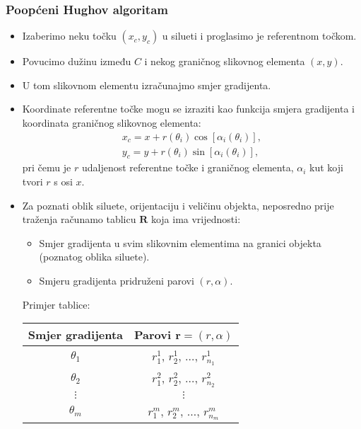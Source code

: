 \documentclass[11pt,english]{article}
\begin{document}
\subsubsection{Poopćeni Hughov algoritam}
\begin{itemize}
  \item Izaberimo neku točku $(x_c,y_c)$ u silueti i proglasimo je referentnom točkom.
  \item Povucimo dužinu između $C$ i nekog graničnog slikovnog elementa $(x,y)$.
  \item U tom slikovnom elementu izračunajmo smjer gradijenta.
  \item Koordinate referentne točke mogu se izraziti kao funkcija smjera gradijenta i koordinata graničnog slikovnog elementa:
  \begin{align*}
    x_c = x+r(\theta_i)\cos[\alpha_i(\theta_i)],\\
    y_c = y+r(\theta_i)\sin[\alpha_i(\theta_i)],
  \end{align*}
  pri čemu je $r$ udaljenost referentne točke i graničnog elementa, $\alpha_i$ kut koji tvori $r$ s osi $x$.
  \item Za poznati oblik siluete, orijentaciju i veličinu objekta, neposredno prije traženja računamo tablicu $\mathbf R$ koja ima vrijednosti:
  \begin{itemize}
    \item Smjer gradijenta u svim slikovnim elementima na granici objekta (poznatog oblika siluete).
    \item Smjeru gradijenta pridruženi parovi $(r,\alpha)$.
  \end{itemize}
  Primjer tablice:
  \begin{center}
    \begin{tabular}{cc}
      \toprule
      Smjer gradijenta & Parovi $\mathbf r = (r,\alpha)$\\
      \midrule
      $\theta_1$ & $r_1^1$, $r_2^1$, $\ldots$, $r_{n_1}^1$\\
      $\theta_2$ & $r_1^2$, $r_2^2$, $\ldots$, $r_{n_2}^2$\\
      $\vdots$ & $\vdots$\\
      $\theta_m$ & $r_1^m$, $r_2^m$, $\ldots$, $r_{n_m}^m$\\
      \bottomrule
    \end{tabular}
  \end{center}
\end{itemize}
\end{document}
